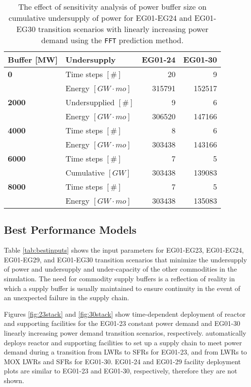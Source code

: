 \begin{table}[h]
	\centering
	\caption{The effect of sensitivity analysis of power buffer size on cumulative 
	undersupply of power for EG01-EG24 and EG01-EG30 transition scenarios with linearly 
	increasing power demand using the \texttt{FFT} prediction method.}
	\label{tab:buff_size}
	\footnotesize
		\begin{tabular}{l|lrr}
                \hline
        \textbf{Buffer [MW]}     & \textbf{Undersupply}             & \textbf{EG01-24}   & \textbf{EG01-30} \\
		\hline
		\textbf{0}             & Time steps $[\#]$ & 20 & 9\\  
                      & Energy $[GW\cdot mo]$    & 315791 & 152517 \\ \hline
		\textbf{2000}          & Undersupplied $[\#]$ & 9 & 6 \\  
        	      & Energy $[GW\cdot mo]$    & 306520 & 147166 \\ \hline
        \textbf{4000}          & Time steps $[\#]$ & 8 & 6 \\  
				  & Energy $[GW\cdot mo]$    & 303438 & 143166 \\ \hline
		\textbf{6000}          & Time steps $[\#]$ & 7 & 5 \\  
		& Cumulative $[GW]$    & 303438 & 139083 \\ \hline
        \textbf{8000}          & Time steps $[\#]$ & 7 & 5  \\  
	              & Energy $[GW\cdot mo]$    & 303438 & 135083 \\ \hline
	\end{tabular}
\end{table}

\subsection{Best Performance Models}
Table \ref{tab:bestinputs} shows the \deploy input parameters for
EG01-EG23, EG01-EG24, EG01-EG29, and EG01-EG30 transition scenarios
that minimize the undersupply of power and 
undersupply and under-capacity of the other commodities
in the simulation. 
The need for commodity supply buffers is a reflection of reality
in which a supply buffer is usually maintained to ensure 
continuity in the event of an unexpected failure in the supply chain.

Figures \ref{fig:23stack} and \ref{fig:30stack} show
time-dependent deployment of reactor and supporting facilities for 
the EG01-23 constant power demand and EG01-30 linearly increasing power demand 
transition scenarios, respectively. 
\deploy automatically deploys reactor and supporting facilities 
to set up a supply chain to meet power demand
during a transition from \glspl{LWR} to \glspl{SFR} for EG01-23, 
and from \glspl{LWR} to \gls{MOX} \glspl{LWR} and \glspl{SFR} for 
EG01-30. 
EG01-24 and EG01-29 facility deployment plots are similar to 
EG01-23 and EG01-30, respectively, therefore they are not shown. 

